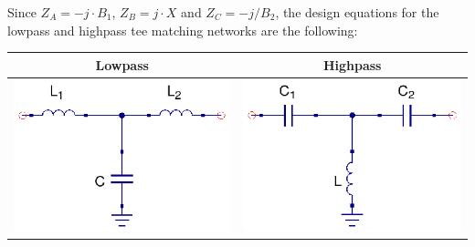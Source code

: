 \noindent Since $Z_A = -j\cdot B_1$, $Z_B = j\cdot X$ and $Z_C = -j/B_2$, the design equations for the lowpass and highpass tee matching networks are the following:

\begin{table}[H]
  \centering
  \begin{tabular}{ | c | c | }
    \hline
    Lowpass & Highpass\\ \hline
    \begin{minipage}{.4\textwidth}
      \includegraphics[width=\linewidth]{Lowpass-Tee}
    \end{minipage}
    &
    \begin{minipage}{.4\textwidth}
      \includegraphics[width=\linewidth]{Highpass-Tee}
    \end{minipage}
\\ \hline

\end{tabular}
\end{table}
